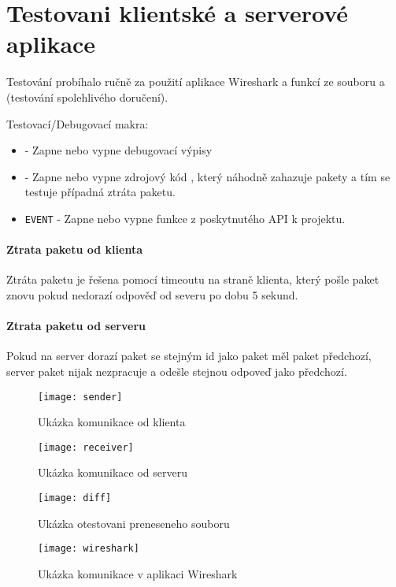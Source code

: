 \section{Testovani klientské a serverové aplikace}\label{sec:testovani}
Testování probíhalo ručně za použití aplikace Wireshark a funkcí
ze souboru  a 
(testování spolehlivého doručení).

Testovací/Debugovací makra:
\begin{itemize}
    \item {} - Zapne nebo vypne debugovací výpisy
    \item {} - Zapne nebo vypne zdrojový kód
    , který náhodně zahazuje pakety
    a tím se testuje případná ztráta paketu.
    \item \texttt{EVENT} - Zapne nebo vypne funkce z poskytnutého API k projektu.
\end{itemize}

\paragraph{Ztrata paketu od klienta}
Ztráta paketu je řešena pomocí timeoutu na straně klienta, který pošle
paket znovu pokud nedorazí odpověď od severu po dobu 5 sekund.

\paragraph{Ztrata paketu od serveru}
Pokud na server dorazí paket se stejným id jako paket měl
paket předchozí, server
paket nijak nezpracuje a odešle stejnou odpoveď jako předchozí.

\begin{figure}[H]
    \centering
    \texttt{[image: sender]}
    \caption{Ukázka komunikace od klienta}
    \label{fig:a1}
\end{figure}

\begin{figure}[H]
    \centering
    \texttt{[image: receiver]}
    \caption{Ukázka komunikace od serveru}
    \label{fig:a2}
\end{figure}

\begin{figure}[H]
    \centering
    \texttt{[image: diff]}
    \caption{Ukázka otestovani preneseneho souboru}
    \label{fig:a4}
\end{figure}

\begin{figure}[H]
    \centering
    \texttt{[image: wireshark]}
    \caption{Ukázka komunikace v aplikaci Wireshark}
    \label{fig:a5}
\end{figure}
